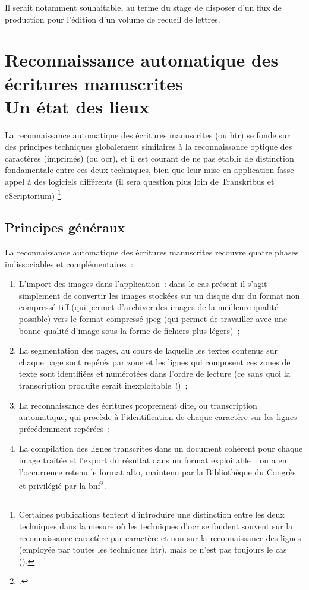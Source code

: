 \documentclass[a4paper,12pt,twoside]{book}
\begin{document}
			Il serait notamment souhaitable, au terme du stage de disposer d'un flux de production pour l'édition d'un volume de recueil de lettres.
				
	\chapter[HTR~: état des lieux]{Reconnaissance automatique des écritures manuscrites \\ \large Un état des lieux}
		
		La reconnaissance automatique des écritures manuscrites (ou \gls{htr}) se fonde sur des principes techniques globalement similaires à la reconnaissance optique des caractères (imprimés) (ou \gls{ocr}), et il est courant de ne pas établir de distinction fondamentale entre ces deux techniques, bien que leur mise en application fasse appel à des logiciels différents (il sera question plus loin de Transkribus et eScriptorium)
		\footnote{Certaines publications tentent d'introduire une distinction entre les deux techniques dans la mesure où les techniques d'\gls{ocr} se fondent souvent sur la reconnaissance caractère par caractère et non sur la reconnaissance des lignes (employée par toutes les techniques \gls{htr}), mais ce n'est pas toujours le cas (\cite{stokesEScriptoriumVREManuscript2021}).}.
		
		\section{Principes généraux}
		
		La reconnaissance automatique des écritures manuscrites recouvre quatre phases indissociables et complémentaires~:
		
		\begin{enumerate}
			\item L'import des images dans l'application~: dans le cas présent il s'agit simplement de convertir les images stockées sur un disque dur du format non compressé \textsf{tiff} (qui permet d'archiver des images de la meilleure qualité possible) vers le format compressé \textsf{jpeg} (qui permet de travailler avec une bonne qualité d'image sous la forme de fichiers plus légers)~;
			\item La \gls{segmentation} des pages, au cours de laquelle les textes contenus sur chaque page sont repérés par zone et les lignes qui composent ces zones de texte sont identifiées et numérotées dans l'ordre de lecture (ce sans quoi la transcription produite serait inexploitable~!)~;
			\item La reconnaissance des écritures proprement dite, ou transcription automatique, qui procède à l'identification de chaque caractère sur les lignes précédemment repérées~;
			\item La compilation des lignes transcrites dans un document cohérent pour chaque image traitée et l'export du résultat dans un format exploitable~: on a en l'occurrence retenu le format \gls{alto}, maintenu par la Bibliothèque du Congrès et privilégié par la \gls{bnf}\footcite{TechniquesFormatsConversion2022, stokesEScriptoriumVREManuscript2021}.
		\end{enumerate}
		
\end{document}
